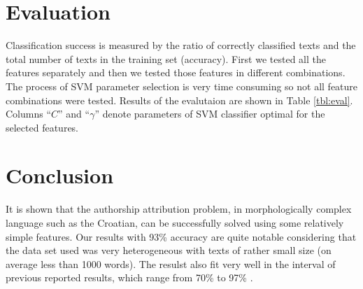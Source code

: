 \documentclass{llncs}
\begin{document}
\section{Evaluation}
\label{sec:evaluacija}
Classification success is measured by the ratio of correctly classified texts and
the total number of texts in the training set (accuracy). First we tested all the
features separately and then we tested those features in different combinations.
The process of SVM parameter selection is very time consuming so not all feature
combinations were tested. Results of the evalutaion are shown in Table
\ref{tbl:eval}. Columns ``$C$'' and ``$\gamma$'' denote parameters of SVM
classifier optimal for the selected features.




% 
% 

\section{Conclusion}
It is shown that the authorship attribution problem, in morphologically complex
language such as the Croatian, can be successfully solved using some relatively
simple features. Our results with 93\% accuracy are quite notable considering
that the data set used was very heterogeneous with texts of rather small
size (on average less than 1000 words). The resulst also fit very well in the
interval of previous reported results, which range from 70\% to 97\% \cite{coyotl2006authorship,keselj2003n,luyckx2005shallow,stamatatos2001computer}.
\end{document}
